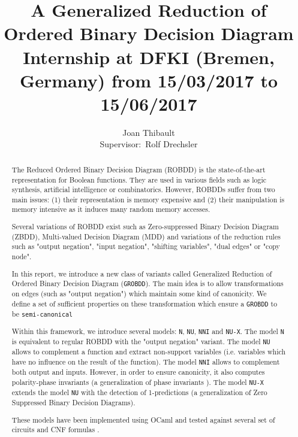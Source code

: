 \documentclass[a4paper,10pt]{article}
\title{A Generalized Reduction of Ordered Binary Decision Diagram\\{\small Internship at DFKI (Bremen, Germany) from 15/03/2017 to 15/06/2017}}
\author{Joan Thibault\\Supervisor:~Rolf Drechsler}
\newcommand{\GroBdd}{\texttt{GROBDD}}
\begin{document}
\maketitle
\begin{abstract}
The Reduced Ordered Binary Decision Diagram (ROBDD)\cite{Bryant1986, Somenzi1999} is the state-of-the-art representation for Boolean functions.
They are used in various fields such as logic synthesis, artificial intelligence or combinatorics.
However, ROBDDs suffer from two main issues: (1) their representation is memory expensive and (2) their manipulation is memory intensive as it induces many random memory accesses.


Several variations of ROBDD exist such as Zero-suppressed Binary Decision Diagram (ZBDD)\cite{IntroZDD}, Multi-valued Decision Diagram (MDD)\cite{IntroMDD, IntroMddRolf} and variations of the reduction rules such as "output negation"\cite{BryantVariantN}, "input negation"\cite{MinatoVariants}, "shifting variables"\cite{MinatoVariants}, "dual edges"\cite{RolfVariantDual} or "copy node"\cite{RolfVariantCopy}.


In this report, we introduce a new class of variants called Generalized Reduction of Ordered Binary Decision Diagram (\GroBdd{}).
The main idea is to allow transformations on edges (such as "output negation") which maintain some kind of canonicity.
We define a set of sufficient properties on these transformation which ensure a \GroBdd{} to be \texttt{semi-canonical}

Within this framework, we introduce several models: \texttt{N}, \texttt{NU}, \texttt{NNI} and \texttt{NU-X}.
The model \texttt{N} is equivalent to regular ROBDD with the "output negation" variant.
The model \texttt{NU} allows to complement a function and extract non-support variables (i.e. variables which have no influence on the result of the function).
The model \texttt{NNI} allows to complement both output and inputs. However, in order to ensure canonicity, it also computes polarity-phase invariants (a generalization of phase invariants \cite{BurchLong1992}).
The model \texttt{NU-X} extends the model \texttt{NU} with the detection of 1-predictions (a generalization of Zero Suppressed Binary Decision Diagrams).

These models have been implemented using OCaml \cite{DAGamlGitHub} and tested against several set of circuits \cite{BenchSatlib, BenchLgsynth91} and CNF formulas \cite{BenchIscas99}.
\end{abstract}

\newpage
\end{document}
